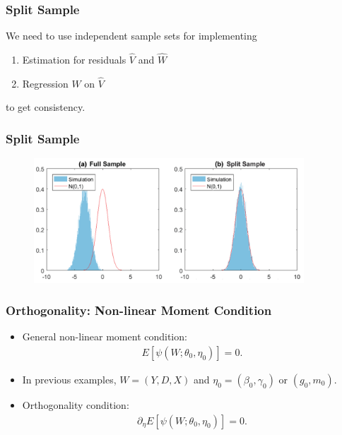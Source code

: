 \documentclass[aspectratio=169, 12pt]{beamer}
\begin{document}
	\begin{frame}
	\frametitle{Split Sample}
	We need to use independent sample sets for implementing 
	\begin{enumerate}
	\item Estimation for residuals $\hat{V}$ and $\hat{W}$
	\item Regression $\hat{W} $ on $\hat{V}$
	\end{enumerate}
	to get consistency.

	\end{frame}

	\begin{frame}
	\frametitle{Split Sample}
	\begin{figure}
	\includegraphics[width=0.9\textwidth]{fig/fig2.png}
	\end{figure}

	\end{frame}

	\begin{frame}
	\frametitle{Orthogonality: Non-linear Moment Condition}
	\begin{itemize}
	\item General non-linear moment condition:
	\begin{eqnarray*}
	E[\psi(W; \theta_0, \eta_0) ] = 0.
	\end{eqnarray*}
	\item In previous examples, $W=(Y,D,X) $ and $\eta_0 = (\beta_0,\gamma_0)$ or $(g_0,m_0)$.
	\item Orthogonality condition:
	\begin{eqnarray*}
	\partial_\eta E[\psi(W; \theta_0, \eta_0) ] = 0.
	\end{eqnarray*}
	\end{itemize}

	\end{frame}
\end{document}
